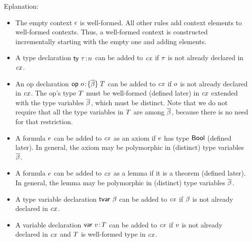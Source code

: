 Eplanation:
\begin{itemize}
\item
The empty context $\epsilon$ is well-formed. All other rules add context elements
to well-formed contexts. Thus, a well-formed context is constructed
incrementally starting with the empty one and adding elements.
\item
A type declaration $\mathsf{ty}\ \tau\!:\!n$ can be added to $\mathit{cx}$ if $\tau$ is not already
declared in $\mathit{cx}$.
\item
An op declaration $\mathsf{op}\ o\!:\!\{\overline{\beta}\}\;T$ can be added to $\mathit{cx}$ if $o$ is not already
declared in $\mathit{cx}$. The op's type $T$ must be well-formed (defined later) in
$\mathit{cx}$ extended with the type variables $\overline{\beta}$, which must be distinct. Note
that we do not require that all the type variables in $T$ are among
$\overline{\beta}$, because there is no need for that restriction.
\item
A formula $e$ can be added to $\mathit{cx}$ as an axiom if $e$ has type
$\mathsf{Bool}$ (defined later). In general, the axiom may be polymorphic in
(distinct) type variables $\overline{\beta}$.
\item
A formula $e$ can be added to $\mathit{cx}$ as a lemma if it is a theorem (defined
later). In general, the lemma may be polymorphic in (distinct) type variables
$\overline{\beta}$.
\item
A type variable declaration $\mathsf{tvar}\ \beta$ can be added to $\mathit{cx}$ if $\beta$ is not
already declared in $\mathit{cx}$.
\item
A variable declaration $\mathsf{var}\ v\!:\!T$ can be added to $\mathit{cx}$ if $v$ is not already
declared in $\mathit{cx}$ and $T$ is well-formed type in $\mathit{cx}$.
\end{itemize}




